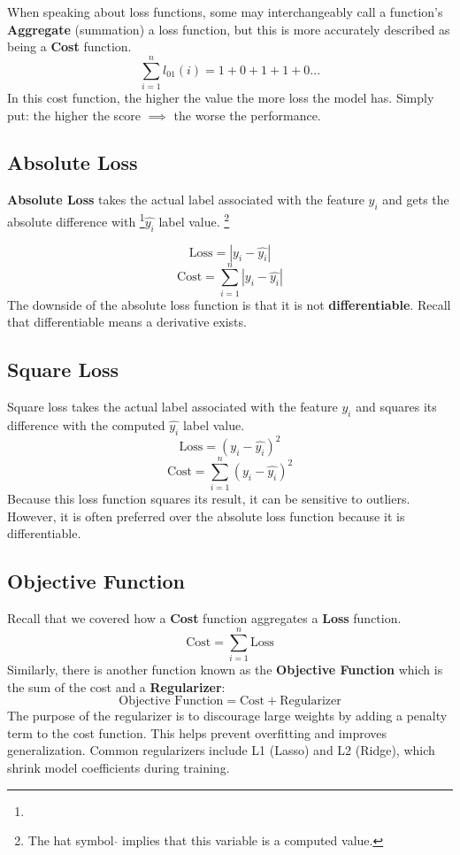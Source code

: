 When speaking about loss functions, some may interchangeably call a function's \textbf{Aggregate} (summation) a loss function, but this is more accurately described as being a \textbf{Cost} function.
\[ 
\sum_{i=1}^{n} l_{01}(i) = 1 + 0 + 1 + 1 + 0 . . . 
\]
In this cost function, the higher the value the more loss the model has. Simply put: the higher the score $\implies$ the worse the performance. 

\subsection{Absolute Loss}
\textbf{Absolute Loss} takes the actual label associated with the feature $y_i$ and gets the absolute difference with \footnote{}$\hat{y_i}$ label value.
\footnote[1]{The hat symbol $\hat{}$ implies that this variable is a computed value.}

\[ 
\text{Loss}=|y_i - \hat{y_i}|
\]
\[ 
\text{Cost}=\sum_{i=1}^{n} |y_i - \hat{y_i}|
\]
The downside of the absolute loss function is that it is not \textbf{differentiable}. Recall that differentiable means a derivative exists.

\subsection{Square Loss}
Square loss takes the actual label associated with the feature $y_i$ and squares its difference with the computed $\hat{y_i}$ label value.
\[ 
\text{Loss}=(y_i - \hat{y_i})^2
\]
\[ 
\text{Cost}=\sum_{i=1}^{n} (y_i - \hat{y_i})^2
\]
Because this loss function squares its result, it can be sensitive to outliers. However, it is often preferred over the absolute loss function because it is differentiable.

\subsection{Objective Function}
Recall that we covered how a \textbf{Cost} function aggregates a \textbf{Loss} function.
\[ 
\text{Cost}=\sum_{i=1}^{n} \text{Loss}
\]
Similarly, there is another function known as the \textbf{Objective Function} which is the sum of the cost and a \textbf{Regularizer}:
\[ 
\text{Objective Function}=\text{Cost} + \text{Regularizer}
\]
The purpose of the regularizer is to discourage large weights by adding a penalty term to the cost function. This helps prevent overfitting and improves generalization. Common regularizers include L1 (Lasso) \cite{tibshirani1996lasso} and L2 (Ridge), which shrink model coefficients during training.

